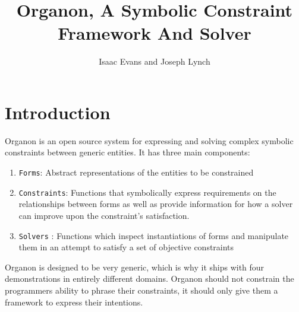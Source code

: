 \documentclass[12pt,a4paper]{article}
\author{Isaac Evans and Joseph Lynch}
\title{Organon, A Symbolic Constraint Framework And Solver}
\begin{document}

\lstset{
 language=Scheme
}

\maketitle
\newpage
\tableofcontents
\newpage
\section{Introduction}
Organon is an open source system for expressing and solving complex symbolic constraints between generic entities. It has three main components: 
\begin{enumerate}
\item \texttt{Forms}: Abstract representations of the entities to be constrained
\item \texttt{Constraints}: Functions that symbolically express requirements on the relationships between forms as well as provide information for how a solver can improve upon the constraint's satisfaction.
\item \texttt{Solvers} : Functions which inspect instantiations of forms and manipulate them in an attempt to satisfy a set of objective constraints
\end{enumerate}

Organon is designed to be very generic, which is why it ships with four demonstrations in entirely different domains.  Organon should not constrain the programmers ability to phrase their constraints, it should only give them a framework to express their intentions.
\end{document}
